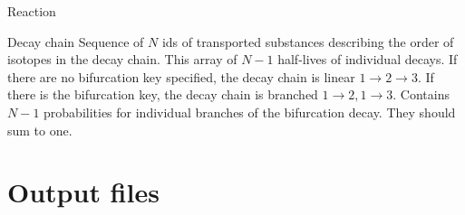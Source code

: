 \documentclass[12pt,a4paper]{report}
\makeatletter
\newcommand{\key}[1]{{\tt #1 }}
\newcommand{\type}[1]{{\bf #1}}
\newenvironment{initable}[1]{%
        \vspace{4ex}
        \noindent
        Section: \textbf{[#1]}\\
        \begingroup
       \newcommand{\br}{\hfill\break}
        \renewcommand{\arraystretch}{1.4}
        \renewcommand{\tabcolsep}{2mm}
        \small
        \baselineskip 3ex
        \tabularx{\textwidth}{l>{\centering}p{2cm}>{\raggedright}p{2cm}>{\raggedright\arraybackslash}X}%
        \hline\hline
        KEY & TYPE & DEFAULT & DESCRIPTION \\%
        \hline\hline
}{%
        \endtabularx
        \endgroup
}
\makeatother
\begin{document}
\begin{recordtype}{Reaction}{}
%
%
%
\end{recordtype}

\begin{recordtype}{Decay chain}{}
Sequence of $N$ ids of transported substances describing the order of isotopes in the decay chain.
This array of $N-1$ half-lives of individual decays.
If there are no bifurcation key specified, the decay chain is linear $1\to 2 \to 3$.
If there is the bifurcation key, the decay chain is branched $1\to 2, 1\to 3$.
Contains $N-1$ probabilities for individual branches of the bifurcation decay.
They should sum to one.
\end{recordtype}


 


 
  
   

\section{Output files}

\end{document}
